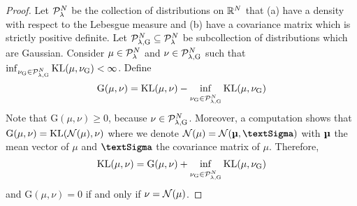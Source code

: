 \documentclass[12pt, twoside]{report}
\begin{document}
\begin{proof}
    Let $\mathcal{P}^N_\lambda$ be the collection of distributions on $\mathbb{R}^N$
    that (a) have a density with respect to the Lebesgue measure and (b) have a covariance matrix which is strictly positive definite.
    Let $\Pc\ss{$\lambda$,G}^N \sub \Pc_\lambda^N$ be subcollection of distributions which are Gaussian.
    Consider $\mu \in \mathcal{P}_\lambda^N$ and $\nu \in \Pc\ss{$\lambda$,G}^N$ such that
    $\inf_{\nu\ss{G} \in \Pc\ss{$\lambda$,G}^N} \KL(\mu, \nu\ss{G}) < \infty$.
    Define
    \begin{equation}
        \text{G}(\mu, \nu) =%
            \KL(\mu, \nu) - \inf_{\nu\ss{G} \in \Pc\ss{$\lambda$,G}^N} \KL(\mu, \nu\ss{G})
    \end{equation}
    Note that $\text{G}(\mu, \nu) \ge 0$, because $\nu \in \Pc\ss{$\lambda$,G}^N$.
    Moreover, a computation shows that $\text{G}(\mu, \nu) = \operatorname{KL}(\mathcal{N}(\mu), \nu)$
    where we denote $\Normal(\mu) = \Normal(\vmu, \mSigma)$ with $\vmu$ the mean vector of $\mu$ and $\mSigma$ the covariance matrix of $\mu$.
    Therefore,
    \begin{equation}
        \KL(\mu, \nu)
        =
        \text{G}(\mu, \nu)
        + \inf_{\nu\ss{G} \in \Pc\ss{$\lambda$,G}^N} \KL(\mu, \nu\ss{G})
    \end{equation}
 and $\text{G}(\mu, \nu) = 0$ if and only if $\nu = \mathcal{N}(\mu)$.


\end{proof}
\end{document}
